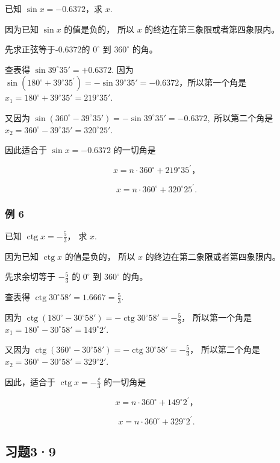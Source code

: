 已知 \(\sin x = -0.6372\)，求 \(x\).

 因为已知 \(\sin x\) 的值是负的， 所以 \(x\)
的终边在第三象限或者第四象限内。

先求正弦等于-0.6372的 \(0^{\circ}\) 到 \(360^{\circ}\) 的角。

查表得 \(\sin 39^{\circ}35' = +0.6372.\) 因为
\(\sin (180^{\circ} + 39^{\circ}35^{\prime}) = -\sin 39^{\circ}35' = -0.6372\)，所以第一个角是
\(x_{1} = 180^{\circ} + 39^{\circ}35' = 219^{\circ}35'\).

又因为
\(\sin (360^{\circ} - 39^{\circ}35') = -\sin 39^{\circ}35' = -0.6372,\)
所以第二个角是 \(x_{2} = 360^{\circ} - 39^{\circ}35' = 320^{\circ}25'\).

因此适合于 \(\sin x = -0.6372\) 的一切角是

\[
x = n \cdot 360 ^{\circ} + 219 ^{\circ} 35 ^{\prime}\text{，}
\]

\[
x = n \cdot 360 ^{\circ} + 320 ^{\circ} 25 ^{\prime}.
\]

\subsubsection{例 6}

已知 \(\operatorname{ctg} x = -\frac{5}{3}\)， 求 \(x\).

 因为已知 \(\operatorname{ctg} x\) 的值是负的， 所以
\(x\) 的终边在第二象限或者第四象限内。

先求余切等于 \(-\frac{5}{3}\) 的 \(0^{\circ}\) 到 \(360^{\circ}\) 的角。

查表得 \(\operatorname{ctg} 30^{\circ} 58' = 1.6667 = \frac{5}{3}\).

因为
\(\operatorname{ctg}(180^{\circ} - 30^{\circ}58') = -\operatorname{ctg}30^{\circ}58' = -\frac{5}{3}\)，
所以第一个角是 \(x_{1} = 180^{\circ} - 30^{\circ}58' = 149^{\circ}2'\).

又因为
\(\operatorname{ctg}(360^{\circ} - 30^{\circ}58') = -\operatorname{ctg}30^{\circ}58' = -\frac{5}{3}\)，
所以第二个角是 \(x_{2} = 360^{\circ} - 30^{\circ}58' = 329^{\circ}2'\).

因此，适合于 \(\operatorname{ctg} x = -\frac{\xi}{3}\) 的一切角是

\[
x = n \cdot 360 ^{\circ} + 149 ^{\circ} 2 ^{\prime}\text{，}
\]

\[
x = n \cdot 360 ^{\circ} + 329 ^{\circ} 2 ^{\prime}.
\]

\subsection{习题3·9}

